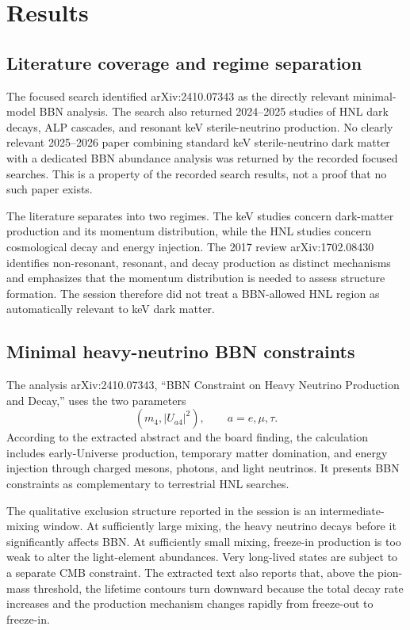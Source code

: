 \documentclass[11pt,a4paper]{article}
\begin{document}
\section{Results}

\subsection{Literature coverage and regime separation}

The focused search identified arXiv:2410.07343 as the directly relevant minimal-model BBN analysis. The search also returned 2024--2025 studies of HNL dark decays, ALP cascades, and resonant keV sterile-neutrino production. No clearly relevant 2025--2026 paper combining standard keV sterile-neutrino dark matter with a dedicated BBN abundance analysis was returned by the recorded focused searches. This is a property of the recorded search results, not a proof that no such paper exists.

The literature separates into two regimes. The keV studies concern dark-matter production and its momentum distribution, while the HNL studies concern cosmological decay and energy injection. The 2017 review arXiv:1702.08430 identifies non-resonant, resonant, and decay production as distinct mechanisms and emphasizes that the momentum distribution is needed to assess structure formation. The session therefore did not treat a BBN-allowed HNL region as automatically relevant to keV dark matter.

\subsection{Minimal heavy-neutrino BBN constraints}

The analysis arXiv:2410.07343, ``BBN Constraint on Heavy Neutrino Production and Decay,'' uses the two parameters
\[
\left(m_4,\lvert U_{a4}\rvert^2\right),
\qquad a=e,\mu,\tau .
\]
According to the extracted abstract and the board finding, the calculation includes early-Universe production, temporary matter domination, and energy injection through charged mesons, photons, and light neutrinos. It presents BBN constraints as complementary to terrestrial HNL searches.

The qualitative exclusion structure reported in the session is an intermediate-mixing window. At sufficiently large mixing, the heavy neutrino decays before it significantly affects BBN. At sufficiently small mixing, freeze-in production is too weak to alter the light-element abundances. Very long-lived states are subject to a separate CMB constraint. The extracted text also reports that, above the pion-mass threshold, the lifetime contours turn downward because the total decay rate increases and the production mechanism changes rapidly from freeze-out to freeze-in.
\end{document}
